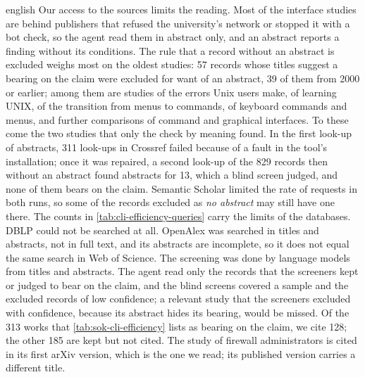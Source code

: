 \begin{onlyin}{english}
Our access to the sources limits the reading.  Most of the interface
studies are behind publishers that refused the university's network or
stopped it with a bot check, so the agent read them in abstract only,
and an
abstract reports a finding without its conditions.  The rule that a
record without an abstract is excluded weighs most on the oldest
studies: 57 records whose titles suggest a bearing on the claim were
excluded for want of an abstract, 39 of them from 2000 or earlier;
among them are studies of the errors Unix users make, of learning UNIX,
of the transition from menus to commands, of keyboard commands and
menus, and further comparisons of command and graphical interfaces.  To
these come the two studies that only the check by meaning found.  In
the first look-up of abstracts, 311 look-ups in Crossref failed because
of a fault in the tool's installation; once it was repaired, a second
look-up of the 829 records then without an abstract found abstracts for
13, which a blind screen judged, and none of them bears on the claim.
Semantic Scholar limited the rate of requests in both runs, so some of
the records excluded as \emph{no abstract} may still have one there.
The
counts in \cref{tab:cli-efficiency-queries} carry the limits of the
databases.  DBLP could not be searched at all.  OpenAlex was searched in
titles and abstracts, not in full text, and its abstracts are
incomplete, so it does not equal the same search in Web of Science.
The screening was done by language models from titles and abstracts.
The agent read only the records that the screeners kept or judged to
bear on the claim, and the blind screens covered a sample and the
excluded records of low confidence; a relevant study that the screeners
excluded with confidence, because its abstract hides its bearing, would
be missed.  Of the 313 works that \cref{tab:sok-cli-efficiency} lists as
bearing on the claim, we cite 128; the other 185 are kept but not cited.
The study of firewall administrators is cited in its first arXiv
version, which is the one we read; its published version carries a
different title.
\end{onlyin}
